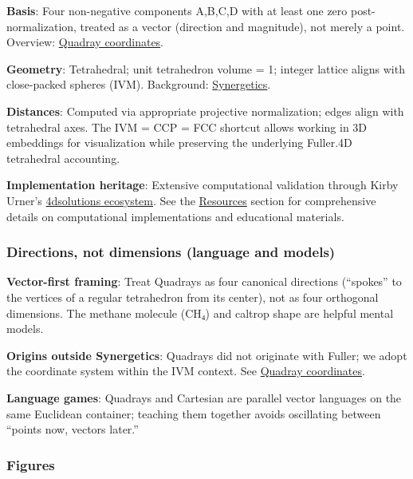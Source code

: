 \documentclass[
  10pt,
]{article}
\begin{document}
\textbf{Basis}: Four non-negative components A,B,C,D with at least one
zero post-normalization, treated as a vector (direction and magnitude),
not merely a point. Overview:
\href{https://en.wikipedia.org/wiki/Quadray_coordinates}{Quadray
coordinates}.

\textbf{Geometry}: Tetrahedral; unit tetrahedron volume = 1; integer
lattice aligns with close-packed spheres (IVM). Background:
\href{https://en.wikipedia.org/wiki/Synergetics_(Fuller)}{Synergetics}.

\textbf{Distances}: Computed via appropriate projective normalization;
edges align with tetrahedral axes. The IVM = CCP = FCC shortcut allows
working in 3D embeddings for visualization while preserving the
underlying Fuller.4D tetrahedral accounting.

\textbf{Implementation heritage}: Extensive computational validation
through Kirby Urner's \href{https://github.com/4dsolutions}{4dsolutions
ecosystem}. See the \href{07_resources.md}{Resources} section for
comprehensive details on computational implementations and educational
materials.

\subsubsection{Directions, not dimensions (language and
models)}\label{directions-not-dimensions-language-and-models}

\textbf{Vector-first framing}: Treat Quadrays as four canonical
directions (``spokes'' to the vertices of a regular tetrahedron from its
center), not as four orthogonal dimensions. The methane molecule (CH₄)
and caltrop shape are helpful mental models.

\textbf{Origins outside Synergetics}: Quadrays did not originate with
Fuller; we adopt the coordinate system within the IVM context. See
\href{https://en.wikipedia.org/wiki/Quadray_coordinates}{Quadray
coordinates}.

\textbf{Language games}: Quadrays and Cartesian are parallel vector
languages on the same Euclidean container; teaching them together avoids
oscillating between ``points now, vectors later.''

\subsubsection{Figures}\label{figures}
\end{document}
